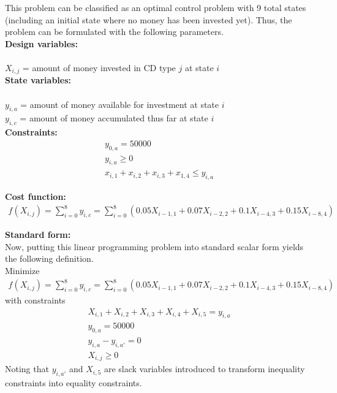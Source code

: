 \documentclass[11pt]{article}
\begin{document}
\begin{prob}{3}
\end{prob}
\begin{sol} 
This problem can be classified as an optimal control problem with 9 total states (including an initial state where no money has been invested yet). Thus, the problem can be formulated with the following parameters.\\

\textbf{Design variables:}\\ \\
$X_{i,j}$ = amount of money invested in CD type $j$ at state $i$ \\
\textbf{State variables:} \\ \\
$y_{i,a}$ = amount of money available for investment at state $i$ \\
$y_{i,c}$ = amount of money accumulated thus far at state $i$ \\

\textbf{Constraints:} 
\begin{eqnarray*}
y_{0,a} = 50000 \\
y_{i,a} \geq 0 \\
x_{i,1} + x_{i,2} + x_{i,3} + x_{1,4} \leq y_{i,a}
\end{eqnarray*}

\textbf{Cost function:}
\begin{eqnarray*}
f(\textbf{$X_{i,j}$}) = \sum_{i=0}^{8} y_{i,c} = \sum_{i=0}^{8}(0.05X_{i-1,1} + 0.07X_{i-2,2} + 0.1X_{i-4,3} + 0.15X_{i-8,4})
\end{eqnarray*}

\textbf{Standard form:} \\
Now, putting this linear programming problem into standard scalar form yields the following definition.  \\

Minimize 
\begin{eqnarray*}
f(\textbf{$X_{i,j}$}) = \sum_{i=0}^{8} y_{i,c} = \sum_{i=0}^{8}(0.05X_{i-1,1} + 0.07X_{i-2,2} + 0.1X_{i-4,3} + 0.15X_{i-8,4})
\end{eqnarray*}
with constraints 
\begin{eqnarray*}
X_{i,1} + X_{i,2} + X_{i,3} + X_{i,4} + X_{i,5} = y_{i,a} \\
y_{0,a} = 50000 \\
y_{i,a} - y_{i, a'} =  0\\
\textbf{$X_{i,j}$} \geq 0 
\end{eqnarray*}
Noting that $y_{i,a'}$ and $X_{i,5}$ are slack variables introduced to transform inequality constraints into equality constraints. 
\end{sol}
\end{document}
